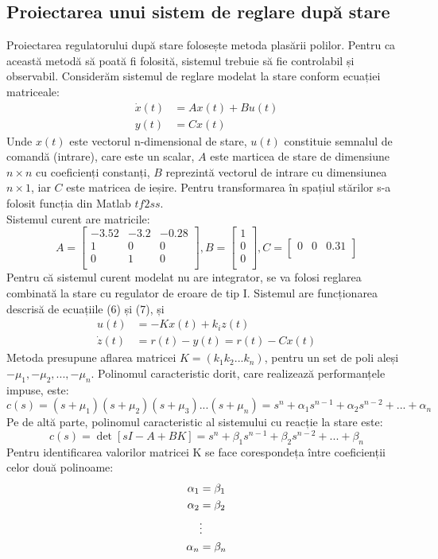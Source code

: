 \documentclass[11pt]{article}
\begin{document}
\subsection{Proiectarea unui sistem de reglare după stare}
Proiectarea regulatorului după stare folosește metoda plasării polilor. Pentru ca această metodă să poată fi
folosită, sistemul trebuie să fie controlabil și observabil.
Considerăm sistemul de reglare modelat la stare conform ecuației matriceale:
\begin{align}
\dot{x}(t)&=Ax(t)+Bu(t)\\
y(t)&=Cx(t)
\end{align}
Unde $x(t)$ este vectorul n-dimensional de stare, $u(t)$ constituie semnalul de comandă (intrare), care este un
scalar, $A$ este marticea de stare de dimensiune $n \times n$ cu coeficienți constanți, $B$ reprezintă vectorul de intrare
cu dimensiunea $n \times 1$, iar $C$ este matricea de ieșire.
Pentru transformarea în spațiul stărilor s-a folosit funcția din Matlab $tf2ss$. \\
Sistemul curent are matricile:
\[A=
\begin{bmatrix}
-3.52       & -3.2 & -0.28\\
1       & 0 & 0\\
0      & 1 & 0\\
\end{bmatrix},
B=
\begin{bmatrix}
1 \\ 
0 \\
0 \\
\end{bmatrix},
C=\begin{bmatrix}
0  &0&0.31      \\
\end{bmatrix}
\]
Pentru că sistemul curent modelat nu are integrator, se va folosi reglarea combinată la stare cu regulator de
eroare de tip I.
Sistemul are funcționarea descrisă de ecuațiile (6) și (7), și
\begin{align}
u(t)&=-Kx(t)+k_{i}z(t)\\
\dot{z}(t)&=r(t)-y(t)=r(t)-Cx(t)
\end{align}
Metoda presupune aflarea matricei $K=(k_1 k_2 ... k_n)$, pentru un set de poli aleși
$-\mu_1, -\mu_2, ..., -\mu_n$. Polinomul caracteristic dorit, care realizează performanțele impuse, este:
\begin{equation}
c(s)=(s+\mu_1)(s+\mu_2)(s+\mu_3) ... (s+\mu_n)=s^n+\alpha_1s^{n-1}+\alpha_2s^{n-2}+...+\alpha_n
\end{equation}
Pe de altă parte, polinomul caracteristic al sistemului cu reacție la stare este:
\begin{equation}
c(s)=\det[sI-A+BK]=s^n+\beta_1s^{n-1}+\beta_2s^{n-2}+...+\beta_n
\end{equation}
Pentru identificarea valorilor matricei K se face corespondeța între coeficienții celor două polinoame:
\begin{align}
\alpha_1&=\beta_1\notag\\
\alpha_2&=\beta_2\notag\\
&\vdots\notag\\
\alpha_n&=\beta_n\notag
\end{align}
\end{document}
